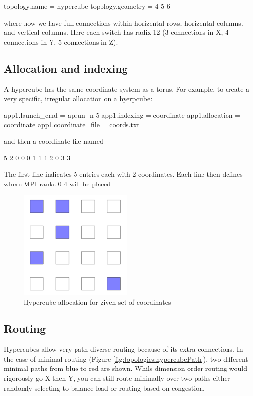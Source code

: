 \begin{ViFile}
topology.name = hypercube
topology.geometry = 4 5 6
\end{ViFile}

where now we have full connections within horizontal rows, horizontal columns, and vertical columns.
Here each switch has radix 12 (3 connections in X, 4 connections in Y, 5 connections in Z). 

\subsection{Allocation and indexing}
A hypercube has the same coordinate system as a torus. For example, to create a very specific, irregular allocation on a hyerpcube:

\begin{ViFile}
app1.launch_cmd = aprun -n 5
app1.indexing = coordinate
app1.allocation = coordinate
app1.coordinate_file = coords.txt
\end{ViFile}

and then a coordinate file named 
\begin{ViFile}
5 2
0 0
0 1
1 1
2 0
3 3
\end{ViFile}
The first line indicates 5 entries each with 2 coordinates.
Each line then defines where MPI ranks 0-4 will be placed

\begin{figure}[h!]
\centering
\includegraphics[width=0.5\textwidth]{figures/tikz/hypercube/hypercube_allocation.png}
\caption{Hypercube allocation for given set of coordinates}
\label{fig:topologies:hypercubeAllocation}
\end{figure}

\subsection{Routing}
Hypercubes allow very path-diverse routing because of its extra connections.
In the case of minimal routing (Figure \ref{fig:topologies:hypercubePath}), two different minimal paths from blue to red are shown.
While dimension order routing would rigorously go X then Y, you can still route minimally over two paths either randomly selecting to balance load or routing based on congestion.

